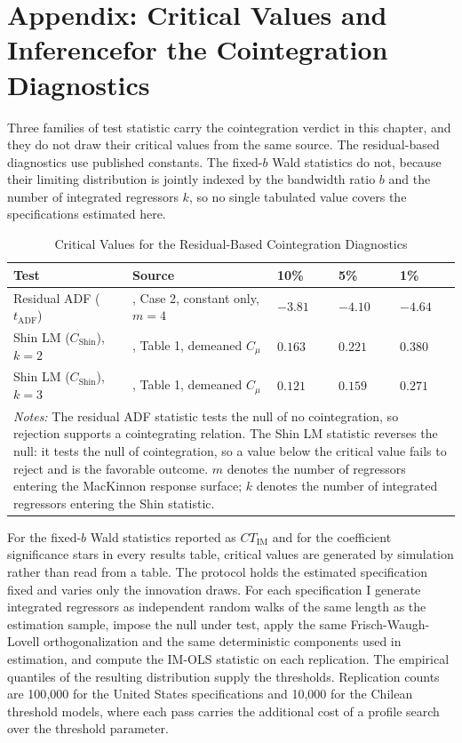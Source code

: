\section{Appendix: Critical Values and Inferencefor the Cointegration Diagnostics}
\label{app:critical_values}

Three families of test statistic carry the cointegration verdict in this
chapter, and they do not draw their critical values from the same source.
The residual-based diagnostics use published constants. The fixed-$b$ Wald
statistics do not, because their limiting distribution is jointly indexed
by the bandwidth ratio $b$ and the number of integrated regressors $k$, so
no single tabulated value covers the specifications estimated here.

\begin{table}[H]
	\centering
	\caption{Critical Values for the Residual-Based Cointegration Diagnostics}
	\label{tab:critical_values}
	\small
	\begin{tabular}{p{5.6cm}p{4.4cm}p{1.4cm}p{1.4cm}p{1.4cm}}
		\toprule
		Test & Source & 10\% & 5\% & 1\% \\
		\midrule
		Residual ADF ($t_{\text{ADF}}$) & \citet{MacKinnon2010}, Case 2,
		constant only, $m=4$ & $-3.81$ & $-4.10$ & $-4.64$ \\
		Shin LM ($C_{\text{Shin}}$), $k=2$ & \citet{Shin1994}, Table 1,
		demeaned $C_\mu$ & $0.163$ & $0.221$ & $0.380$ \\
		Shin LM ($C_{\text{Shin}}$), $k=3$ & \citet{Shin1994}, Table 1,
		demeaned $C_\mu$ & $0.121$ & $0.159$ & $0.271$ \\
		\bottomrule
		\multicolumn{5}{p{14.2cm}}{\footnotesize \textit{Notes:} The
			residual ADF statistic tests the null of no cointegration, so
			rejection supports a cointegrating relation. The Shin LM
			statistic reverses the null: it tests the null of
			cointegration, so a value below the critical value fails to
			reject and is the favorable outcome. $m$ denotes the number
			of regressors entering the MacKinnon response surface; $k$
			denotes the number of integrated regressors entering the Shin
			statistic.} \\
	\end{tabular}
\end{table}

For the fixed-$b$ Wald statistics reported as $CT_{\text{IM}}$ and for the
coefficient significance stars in every results table, critical values are
generated by simulation rather than read from a table. The protocol holds
the estimated specification fixed and varies only the innovation draws.
For each specification I generate integrated regressors as independent
random walks of the same length as the estimation sample, impose the null
under test, apply the same Frisch-Waugh-Lovell orthogonalization and the
same deterministic components used in estimation, and compute the IM-OLS
statistic on each replication. The empirical quantiles of the resulting
distribution supply the thresholds. Replication counts are 100{,}000 for
the United States specifications and 10{,}000 for the Chilean threshold
models, where each pass carries the additional cost of a profile search
over the threshold parameter.

